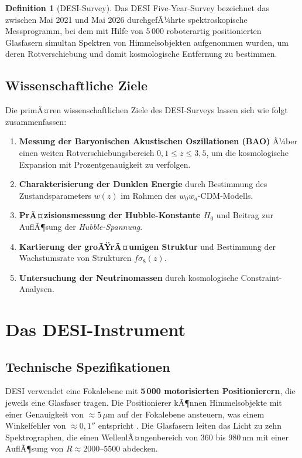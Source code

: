 ﻿\documentclass[a4paper,12pt]{article}
\theoremstyle{definition}
\newtheorem{definition}{Definition}[section]
\theoremstyle{remark}
\begin{document}
\begin{definition}[DESI-Survey]
  Das DESI Five-Year-Survey bezeichnet das zwischen Mai 2021 und Mai 2026
  durchgefÃ¼hrte spektroskopische Messprogramm, bei dem mit Hilfe von
  5\,000 roboterartig positionierten Glasfasern simultan Spektren von
  Himmelsobjekten aufgenommen wurden, um deren Rotverschiebung und damit
  kosmologische Entfernung zu bestimmen.
\end{definition}

\subsection{Wissenschaftliche Ziele}

Die primÃ¤ren wissenschaftlichen Ziele des DESI-Surveys lassen sich wie folgt
zusammenfassen:

\begin{enumerate}[label=\arabic*.]
  \item \textbf{Messung der Baryonischen Akustischen Oszillationen (BAO)} Ã¼ber
    einen weiten Rotverschiebungsbereich $0{,}1 \leq z \leq 3{,}5$, um die
    kosmologische Expansion mit Prozentgenauigkeit zu verfolgen.
  \item \textbf{Charakterisierung der Dunklen Energie} durch Bestimmung des
    Zustandsparameters $w(z)$ im Rahmen des $w_0 w_a$-CDM-Modells.
  \item \textbf{PrÃ¤zisionsmessung der Hubble-Konstante $H_0$} und Beitrag zur
    AuflÃ¶sung der \textit{Hubble-Spannung}.
  \item \textbf{Kartierung der groÃŸrÃ¤umigen Struktur} und Bestimmung der
    Wachstumsrate von Strukturen $f\sigma_8(z)$.
  \item \textbf{Untersuchung der Neutrinomassen} durch kosmologische Constraint-Analysen.
\end{enumerate}

\section{Das DESI-Instrument}
\label{sec:instrument}

\subsection{Technische Spezifikationen}

DESI verwendet eine Fokalebene mit \textbf{5\,000 motorisierten Positionierern},
die jeweils eine Glasfaser tragen. Die Positionierer kÃ¶nnen Himmelsobjekte mit
einer Genauigkeit von $\approx 5\,\mu$m auf der Fokalebene ansteuern, was einem
Winkelfehler von $\approx 0{,}1''$ entspricht \cite{desi2016}. Die Glasfasern
leiten das Licht zu zehn Spektrographen, die einen WellenlÃ¤ngenbereich von
360 bis 980\,nm mit einer AuflÃ¶sung von $R \approx 2000$--$5500$ abdecken.
\end{document}

